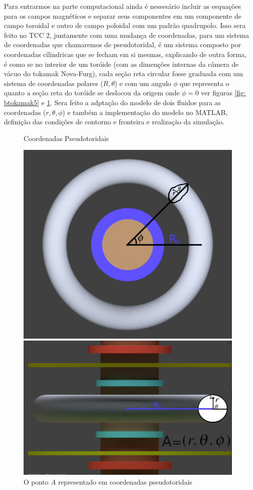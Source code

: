 \documentclass[12pt,oneside,a4paper]{abntex2}
\begin{document}
Para entrarmos na parte computacional ainda é nessesário incluir as esquações para os campos magnéticos e separar seus componentes em um componente de campo toroidal e outro de campo poloidal com um padrão quadrupolo. Isso sera feito no TCC 2, juntamente com uma mudança de coordenadas, para um sistema de coordenadas que chamaremos de pseudotoridal, é um sistema composto por coordenadas cílindricas que se fecham em si mesmas, explicando de outra forma, é como se no interior de um toróide (com as dimenções internas da câmera de vácuo do tokamak Nova-Furg), cada seção reta circular fosse graduada com um sistema de coordenadas polares ($R,\theta$) e com um angulo $\phi$ que representa o quanto a seção reta do toróide se deslocou da origem onde $\phi=0$ ver figuras \ref{fig: btokamak5} e \ref{fig: btokamak6}. Sera feito a adptação do modelo de dois fluidos para as coordenadas ($r,\theta,\phi$) e também a implementação do modelo no MATLAB, definição das condições de contorno e fronteira e realização da simulação. 
\newpage
\begin{figure}[H]
\centering
\caption{Coordenadas Pseudotoridais}
\label{fig: btokamak5}
\includegraphics[scale=0.7]{pseudotoridal1.png}
\caption{O ponto $A$ representado em coordenadas pseudotoridais} 
\label{fig: btokamak6}
\includegraphics[scale=0.45]{pseudotoridal2.png}    
\end{figure}
\end{document}
